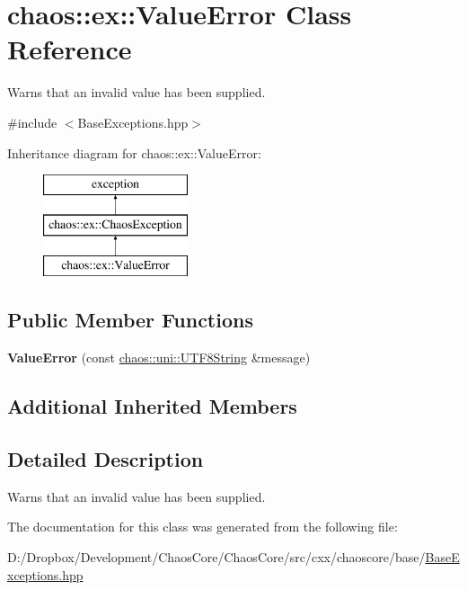 \hypertarget{classchaos_1_1ex_1_1_value_error}{}\section{chaos\+:\+:ex\+:\+:Value\+Error Class Reference}
\label{classchaos_1_1ex_1_1_value_error}


Warns that an invalid value has been supplied.  




{\ttfamily \#include $<$Base\+Exceptions.\+hpp$>$}

Inheritance diagram for chaos\+:\+:ex\+:\+:Value\+Error\+:\begin{figure}[H]
\begin{center}
\leavevmode
\includegraphics[height=3.000000cm]{classchaos_1_1ex_1_1_value_error}
\end{center}
\end{figure}
\subsection*{Public Member Functions}
\begin{DoxyCompactItemize}
\item 
\hypertarget{classchaos_1_1ex_1_1_value_error_a2e38ae92cef2be7b6e7babd4d33d3239}{}{\bfseries Value\+Error} (const \hyperlink{classchaos_1_1uni_1_1_u_t_f8_string}{chaos\+::uni\+::\+U\+T\+F8\+String} \&message)\label{classchaos_1_1ex_1_1_value_error_a2e38ae92cef2be7b6e7babd4d33d3239}

\end{DoxyCompactItemize}
\subsection*{Additional Inherited Members}


\subsection{Detailed Description}
Warns that an invalid value has been supplied. 

The documentation for this class was generated from the following file\+:\begin{DoxyCompactItemize}
\item 
D\+:/\+Dropbox/\+Development/\+Chaos\+Core/\+Chaos\+Core/src/cxx/chaoscore/base/\hyperlink{_base_exceptions_8hpp}{Base\+Exceptions.\+hpp}\end{DoxyCompactItemize}
